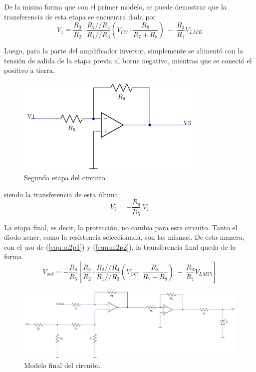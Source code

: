 \documentclass[a4paper]{article}
\begin{document}
De la misma forma que con el primer modelo, se puede demostrar que la transferencia de esta etapa se encuentra dada por
\begin{equation}
	V_1 = \frac{R_3}{R_2} \cdot \frac{R_2 // R_4}{R_1 // R_3} \left( V_{CC} \cdot \frac{R_8}{R_7 + R_8} \right) \ - \ \frac{R_3}{R_1} V_{LM35}
	\label{equ:m2p1}
\end{equation}

Luego, para la parte del amplificador inversor, simplemente se alimentó con la tensión de salida de la etapa previa al borne negativo, mientras que se conectó el positivo a tierra.

\begin{figure}[H]
	\centering
	\includegraphics[width=0.8\textwidth]{Ejercicio6/Imagenes/CircuitoEtapa2-M2.png}
	\caption{Segunda etapa del circuito.}
	\label{fig:cir2-M2}
\end{figure}

siendo la transferencia de esta última
\begin{equation}
	V_3 = - \frac{R_6}{R_5} \ V_1
	\label{equ:m2p2}
\end{equation}

La etapa final, es decir, la protección, no cambia para este circuito. Tanto el diodo zener, como la resistencia seleccionada, son las mismas. De esta manera, con el uso de (\ref{equ:m2p1}) y (\ref{equ:m2p2}), la transferencia final queda de la forma
\begin{equation}
	V_{out} = - \frac{R_6}{R_5} \left[ \frac{R_3}{R_2} \cdot \frac{R_2 // R_4}{R_1 // R_3} \left( V_{CC} \cdot \frac{R_8}{R_7 + R_8} \right) \ - \ \frac{R_3}{R_1} V_{LM35} \right]
	\label{equ:transfm2}
\end{equation}

\begin{figure}[H]
	\centering
	\includegraphics[width=1\textwidth]{Ejercicio6/Imagenes/CircuitoFinal-M2.png}
	\caption{Modelo final del circuito.}
	\label{fig:cirfin-M2}
\end{figure}
\end{document}
